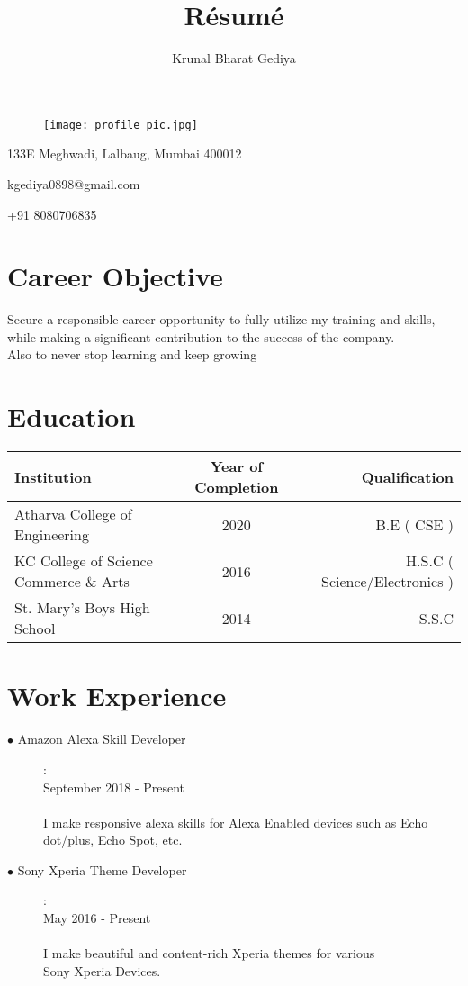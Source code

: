 \documentclass[11pt]{article}
\begin{document}
\title{R\'esum\'e}

\author{Krunal Bharat Gediya}

\maketitle
\begin{figure}[H]
    \centering
    \texttt{[image: profile\_pic.jpg]}
\end{figure}
\begin{center}
    133E Meghwadi, Lalbaug, Mumbai 400012

    kgediya0898@gmail.com
    
    +91 8080706835 
\end{center}

\section{Career Objective}
Secure a responsible career opportunity to fully utilize my training and skills, while making a significant contribution to the success of the company.\\
Also to never stop learning and keep growing
\section{Education}
\begin{table}[h!]
      
      \label{tab:table1}
      \begin{tabular}{l|c|r|} %
        \textbf{Institution} & \textbf{Year of Completion} & \textbf{Qualification}\\
        \hline
        Atharva College of Engineering & 2020 & B.E ( CSE )\\
        KC College of Science Commerce \& Arts & 2016 & H.S.C ( Science/Electronics )\\
        St. Mary's Boys High School & 2014 & S.S.C \\
      \end{tabular}
  \end{table}
\section{Work Experience}
\begin{description}
    \item[$\bullet$ Amazon Alexa Skill Developer]:
    \\September 2018 - Present
    \\\\I make responsive alexa skills for Alexa Enabled devices such as Echo dot/plus, Echo Spot, etc.  
    \item[$\bullet$ Sony Xperia Theme Developer]:
    \\May 2016 - Present
    \\\\I make beautiful and content-rich Xperia themes for various \\Sony Xperia Devices.

\end{description}
\end{document}
